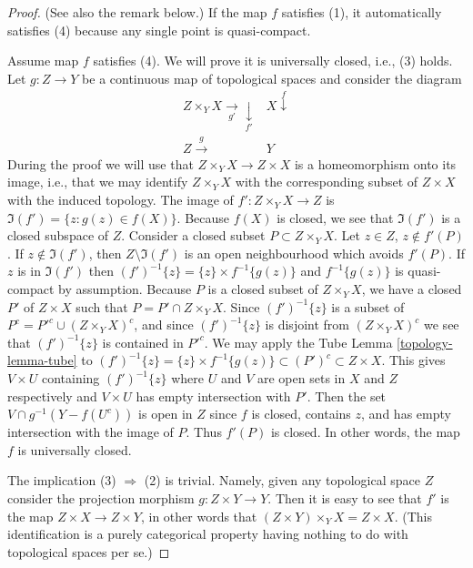 \begin{proof}

(See also the remark below.)
If the map $f$ satisfies (1), it automatically satisfies (4) because
any single point is quasi-compact.

\medskip\noindent
Assume map $f$ satisfies (4).
We  will prove it is universally closed, i.e., (3) holds.
Let $g : Z \to Y$ be a continuous map of topological spaces
and consider the diagram
$$
\begin{array}{cc}Z \times_Y X \underset{g'}{\longrightarrow}\underset{f'}{\downarrow} & X \overset{f}{\downarrow} \\ Z \overset{g}{\longrightarrow} & Y\end{array}
$$
During the proof we will use that $Z \times_Y X \to Z \times X$
is a homeomorphism onto its image, i.e., that we may identify
$Z \times_Y X$ with the corresponding subset of $Z \times X$ with
the induced topology.
The image of $f' : Z \times_Y X \to Z$ is
$\Im(f') = \{z : g(z) \in f(X)\}$.
Because $f(X)$ is closed, we see that
$\Im(f')$ is a closed subspace of $Z$.
Consider a closed subset $P \subset Z \times_Y X$.
Let $z \in Z$, $z \not \in f'(P)$.
If $z \not \in \Im(f')$, then $Z \setminus \Im(f')$
is an open neighbourhood which avoids $f'(P)$.
If $z$ is in $\Im(f')$
then $(f')^{-1}\{z\} = \{z\} \times f^{-1}\{g(z)\}$
and $f^{-1}\{g(z)\}$
is quasi-compact by assumption. Because $P$ is a closed
subset of $Z \times_Y X$, we have a closed $P'$ of $Z \times X$ such
that $P = P' \cap Z \times_Y X$.
Since $(f')^{-1}\{z\}$ is a subset of $P^c = P'^c \cup (Z \times_Y X)^c$,
and since $(f')^{-1}\{z\}$ is disjoint from $(Z \times_Y X)^c$
we see that $(f')^{-1}\{z\}$ is contained in $P'^c$.
We may apply the Tube Lemma \ref{topology-lemma-tube} to
$(f')^{-1}\{z\} = \{z\} \times f^{-1}\{g(z)\}
\subset (P')^c \subset Z \times X$.
This gives $V \times U$ containing
$(f')^{-1}\{z\}$ where $U$ and $V$ are open sets in $X$ and $Z$
respectively and $V \times U$ has empty intersection with $P'$.
Then the set $V \cap g^{-1}(Y-f(U^c))$ is open in $Z$ since $f$
is closed, contains $z$, and has empty intersection with the image of $P$.
Thus $f'(P)$ is closed. In other words, the map $f$ is universally closed.

\medskip\noindent
The implication (3) $\Rightarrow$ (2) is trivial.
Namely, given any topological space $Z$ consider the projection
morphism $g : Z \times Y \to Y$. Then it is easy to see
that $f'$ is the map $Z \times X \to Z \times Y$, in other
words that $(Z \times Y) \times_Y X = Z \times X$. (This identification
is a purely categorical property having nothing to do with
topological spaces per se.)


\end{proof}
